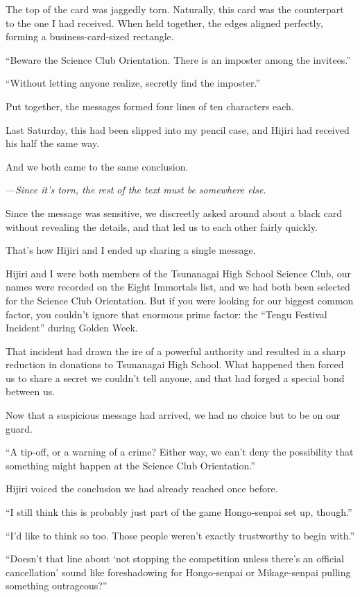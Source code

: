 \documentclass[
    a4paper,
    12pt,
    twoside,
    openany,
    UTF8,
    fontset=windows
]{ctexbook}
\begin{document}
The top of the card was jaggedly torn. Naturally, this card was the counterpart to the one I had received. When held together, the edges aligned perfectly, forming a business-card-sized rectangle.

``Beware the Science Club Orientation. There is an imposter among the invitees.''

``Without letting anyone realize, secretly find the imposter.''

Put together, the messages formed four lines of ten characters each.

Last Saturday, this had been slipped into my pencil case, and Hijiri had received his half the same way.

And we both came to the same conclusion.

---\textit{Since it's torn, the rest of the text must be somewhere else.}

Since the message was sensitive, we discreetly asked around about a black card without revealing the details, and that led us to each other fairly quickly.

That's how Hijiri and I ended up sharing a single message.

Hijiri and I were both members of the Tsunanagai High School Science Club, our names were recorded on the Eight Immortals list, and we had both been selected for the Science Club Orientation. But if you were looking for our biggest common factor, you couldn't ignore that enormous prime factor: the ``Tengu Festival Incident'' during Golden Week.

That incident had drawn the ire of a powerful authority and resulted in a sharp reduction in donations to Tsunanagai High School. What happened then forced us to share a secret we couldn't tell anyone, and that had forged a special bond between us.

Now that a suspicious message had arrived, we had no choice but to be on our guard.

``A tip-off, or a warning of a crime? Either way, we can't deny the possibility that something might happen at the Science Club Orientation.''

Hijiri voiced the conclusion we had already reached once before.

``I still think this is probably just part of the game Hongo-senpai set up, though.''

``I'd like to think so too. Those people weren't exactly trustworthy to begin with.''

``Doesn't that line about `not stopping the competition unless there's an official cancellation' sound like foreshadowing for Hongo-senpai or Mikage-senpai pulling something outrageous?''
\end{document}
